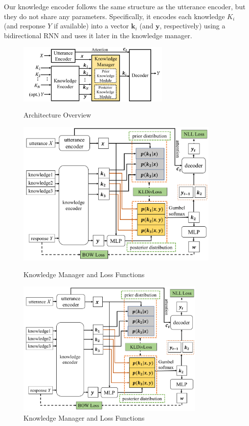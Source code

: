 \documentclass{article}
\begin{document}
Our knowledge encoder follows the same structure as the utterance encoder, 
but they do not share any parameters.
Specifically,
it encodes each knowledge $K_i$ (and response $Y$ if available) 
into a vector $\mathbf{k}_i$ (and $\mathbf{y}$, respectively) using a bidirectional RNN
and uses it later in the knowledge manager.

\begin{figure}[tb]
\centering
\begin{minipage}[b]{.45\textwidth }
\centering
\includegraphics[width=7.5cm]{overview.pdf}
\caption{Architecture Overview}
\label{fig:overview}
\end{minipage}
\begin{minipage}[b]{.5\textwidth }
\centering
\includegraphics[width=10cm]{details.pdf}
\vspace{-0.2cm}
\caption{Knowledge Manager and Loss Functions}
\vspace{-0.2cm}
\label{fig:details}
\end{minipage}
\end{figure}
\fi

\begin{figure}[tb]
\hspace{-0.5cm}
\includegraphics[width=9.3cm]{details.pdf}
\vspace{-0.7cm}
\caption{Knowledge Manager and Loss Functions}
\vspace{-0.2cm}
\label{fig:details}
\end{figure}
\end{document}
